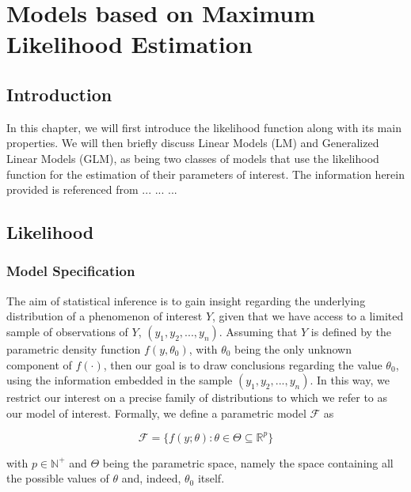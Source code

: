 \chapter{ Models based on Maximum Likelihood Estimation }

\fancyhead[RO,LE]{\thepage}

\setlength{\parskip}{0.5pt}

\bigskip
\section{Introduction}
\large In this chapter, we will first introduce the likelihood function along with its main properties. We will then briefly discuss Linear Models (LM) and Generalized Linear Models (GLM), as being two classes of models that use the likelihood function for the estimation of their parameters of interest. The information herein provided is referenced from ... ... ... %

\section{Likelihood} 
\subsection{Model Specification}

The aim of statistical inference is to gain insight regarding the underlying distribution of a phenomenon of interest $Y$, given that we have access to a limited sample of observations of $Y$, $(y_1,y_2,...,y_n)$. Assuming that $Y$ is defined by the parametric density function $f(y,\theta_0)$, with $\theta_0$ being the only unknown component of $f(\cdot)$, then our goal is to draw conclusions regarding the value $\theta_0$, using the information embedded in the sample $(y_1,y_2,...,y_n)$. In this way, we restrict our interest on a precise family of distributions to which we refer to as our model of interest. Formally, we define a parametric model $\mathcal{F}$ as

$$ \mathcal{F} = \{ f(y;\theta): \theta \in \Theta \subseteq	{\mathbb{R}}^p \} $$

with $p \in {\mathbb{N}}^+$ and $\Theta$ being the parametric space, namely the space containing all the possible values of $\theta$ and, indeed, ${\theta}_0$ itself.





